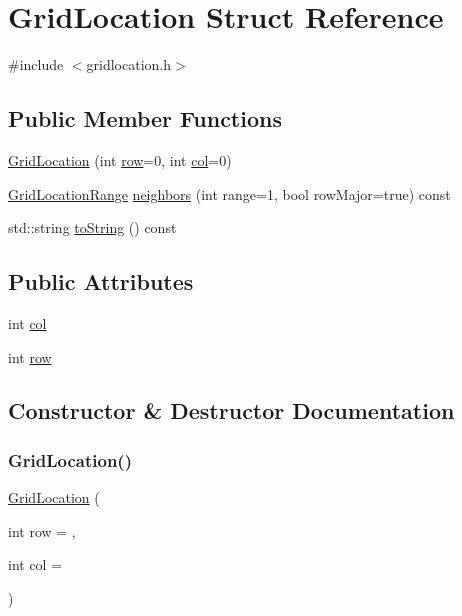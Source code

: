 \hypertarget{structGridLocation}{}\section{Grid\+Location Struct Reference}
\label{structGridLocation}


{\ttfamily \#include $<$gridlocation.\+h$>$}

\subsection*{Public Member Functions}
\begin{DoxyCompactItemize}
\item 
\mbox{\hyperlink{structGridLocation_a295a4da28caf130b541d737162f863dc}{Grid\+Location}} (int \mbox{\hyperlink{structGridLocation_af1d3cff2e4538e23400e260bae3dadad}{row}}=0, int \mbox{\hyperlink{structGridLocation_afb52e720f5f0c483db5861f9e42e924e}{col}}=0)
\item 
\mbox{\hyperlink{classGridLocationRange}{Grid\+Location\+Range}} \mbox{\hyperlink{structGridLocation_a094f1ff0e132adda3ebe98103a24f8a4}{neighbors}} (int range=1, bool row\+Major=true) const
\item 
std\+::string \mbox{\hyperlink{structGridLocation_a1fe5121d6528fdea3f243321b3fa3a49}{to\+String}} () const
\end{DoxyCompactItemize}
\subsection*{Public Attributes}
\begin{DoxyCompactItemize}
\item 
int \mbox{\hyperlink{structGridLocation_afb52e720f5f0c483db5861f9e42e924e}{col}}
\item 
int \mbox{\hyperlink{structGridLocation_af1d3cff2e4538e23400e260bae3dadad}{row}}
\end{DoxyCompactItemize}


\subsection{Constructor \& Destructor Documentation}
\mbox{\label{structGridLocation_a295a4da28caf130b541d737162f863dc}} 
\subsubsection{\texorpdfstring{Grid\+Location()}{GridLocation()}}
{\footnotesize\ttfamily \mbox{\hyperlink{structGridLocation}{Grid\+Location}} (\begin{DoxyParamCaption}\item[{int}]{row = {},  }\item[{int}]{col = {} }\end{DoxyParamCaption})}



